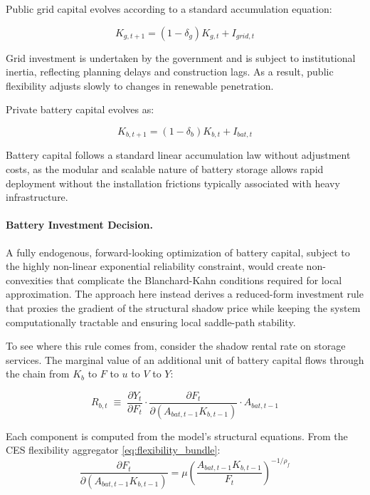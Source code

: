 \documentclass[12pt, a4paper]{article}
\begin{document}
	Public grid capital evolves according to a standard accumulation equation:
	
	\begin{equation}
		K_{g,t+1} = (1-\delta_g)K_{g,t} + I_{grid,t}
		\label{eq:grid_capital}
	\end{equation}
	
	Grid investment is undertaken by the government and is subject to institutional inertia, reflecting planning delays and construction lags. As a result, public flexibility adjusts slowly to changes in renewable penetration.
	
	Private battery capital evolves as:
	
	\begin{equation}
		K_{b,t+1} = (1-\delta_b)K_{b,t} + I_{bat,t}
		\label{eq:battery_capital}
	\end{equation}
	
	Battery capital follows a standard linear accumulation law without adjustment costs, as the modular and scalable nature of battery storage allows rapid deployment without the installation frictions typically associated with heavy infrastructure.
	
	\paragraph{Battery Investment Decision.}
	A fully endogenous, forward-looking optimization of battery capital, subject to the highly non-linear exponential reliability constraint, would create non-convexities that complicate the Blanchard-Kahn conditions required for local approximation. The approach here instead derives a reduced-form investment rule that proxies the gradient of the structural shadow price while keeping the system computationally tractable and ensuring local saddle-path stability.
	
	To see where this rule comes from, consider the shadow rental rate on storage services. The marginal value of an additional unit of battery capital flows through the chain from $K_b$ to $F$ to $u$ to $V$ to $Y$:
	
	\begin{equation}
		R_{b,t} \;\equiv\; \frac{\partial Y_t}{\partial F_t} \cdot \frac{\partial F_t}{\partial (A_{bat,t-1} K_{b,t-1})} \cdot A_{bat,t-1}
		\label{eq:rental_rate}
	\end{equation}
	
	Each component is computed from the model's structural equations. From the CES flexibility aggregator \eqref{eq:flexibility_bundle}:
	\begin{equation}
		\frac{\partial F_t}{\partial (A_{bat,t-1} K_{b,t-1})} = \mu \left(\frac{A_{bat,t-1} K_{b,t-1}}{F_t}\right)^{-1/\rho_f}
		\label{eq:dF_dKb}
	\end{equation}
	
\end{document}
